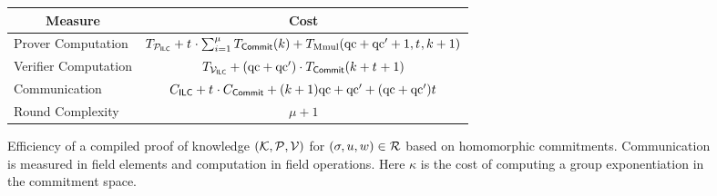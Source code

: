 \begin{figure}[!h]
\begin{tabular}{|l|c|}
\hline
\multicolumn{1}{|c|}{\bf Measure} & {\bf Cost} \\
\hline
Prover Computation & $T_{\mathcal{P}_{\mathsf{ILC}}} + {t_{}} \cdot \sum_{i=1}^{\mu} T_{\mathsf{Commit}}(k) + T_{\text{Mmul}}(\mathrm{qc}+\mathrm{qc}'+1,{t_{}},k+1)$ \\
Verifier Computation & $T_{\mathcal{V}_{\mathsf{ILC}}} + (\mathrm{qc} + \mathrm{qc}') \cdot T_{\mathsf{Commit}}(k+ {t_{}} + 1)$\\
Communication & $C_{\mathsf{ILC}} + {t_{}} \cdot C_{\mathsf{Commit}} + (k+1) \mathrm{qc} + \mathrm{qc}' + (\mathrm{qc}+\mathrm{qc}'){t_{}}$ \\
Round Complexity & $\mu + 1$ \\
\hline
\end{tabular}
\caption{Efficiency of a compiled proof of knowledge $(\mathcal{K},\mathcal{P},\mathcal{V})$ for $(\mathsf{\sigma},u,w)\in \mathcal{R}$ based on homomorphic commitments. Communication is measured in field elements and computation in field operations. Here $\kappa$ is the cost of computing a group exponentiation in the commitment space. }\label{fig:IOPeff2}
\end{figure}